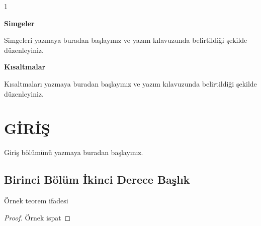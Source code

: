 \documentclass[12pt,oneside]{report}
\begin{document}
	\begin{spacing}{1}
	\tableofcontents                   %
	\end{spacing}
	
	\begin{simge} 
		\textbf{Simgeler}
		
		Simgeleri yazmaya buradan başlayınız ve yazım kılavuzunda belirtildiği şekilde düzenleyiniz. 
					
		\vspace{0.5cm}
		
		\textbf{K\i saltmalar}
		
		Kısaltmaları yazmaya buradan başlayınız ve yazım kılavuzunda belirtildiği şekilde düzenleyiniz.
		
	\end{simge}

	
	\rhead{\thepage}
	\fancyfoot{}
	\renewcommand{\baselinestretch}{1.5}
	
	\chapter{GİRİŞ}
	
	Giriş bölümünü yazmaya buradan başlayınız. 
	
	\section{Birinci Bölüm İkinci Derece Başlık}
	\begin{theorem}\label{teorem1}
		Örnek teorem ifadesi
	\end{theorem}
	
	\begin{proof}
		Örnek ispat
	\end{proof}
\end{document}
